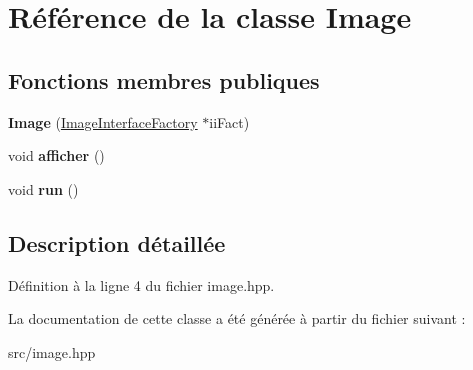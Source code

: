 \hypertarget{classImage}{\section{Référence de la classe Image}
\label{classImage}
}
\subsection*{Fonctions membres publiques}
\begin{DoxyCompactItemize}
\item 
\hypertarget{classImage_a2e8f8d5193e5c6e49de276f9d1f4bdde}{{\bfseries Image} (\hyperlink{classImageInterfaceFactory}{Image\+Interface\+Factory} $\ast$ii\+Fact)}\label{classImage_a2e8f8d5193e5c6e49de276f9d1f4bdde}

\item 
\hypertarget{classImage_a4d957034ad17e3911a4d9f7decdda22c}{void {\bfseries afficher} ()}\label{classImage_a4d957034ad17e3911a4d9f7decdda22c}

\item 
\hypertarget{classImage_a0ee0602472090d8723d081849dfe6e27}{void {\bfseries run} ()}\label{classImage_a0ee0602472090d8723d081849dfe6e27}

\end{DoxyCompactItemize}


\subsection{Description détaillée}


Définition à la ligne 4 du fichier image.\+hpp.



La documentation de cette classe a été générée à partir du fichier suivant \+:\begin{DoxyCompactItemize}
\item 
src/image.\+hpp\end{DoxyCompactItemize}
